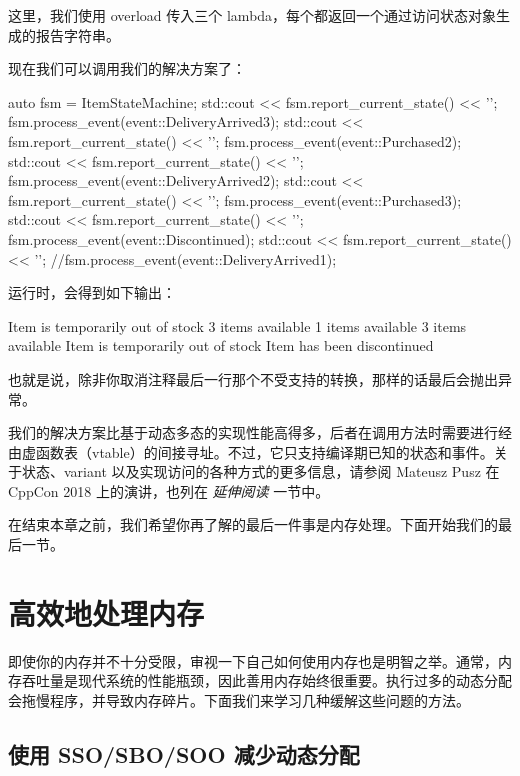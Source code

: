 \label{idx:597}
这里，我们使用 overload 传入三个 lambda，每个都返回一个通过访问状态对象生成的报告字符串。

现在我们可以调用我们的解决方案了：

\begin{codebox}[cpp]
auto fsm = ItemStateMachine{};
std::cout << fsm.report_current_state() << '\n';
fsm.process_event(event::DeliveryArrived{3});
std::cout << fsm.report_current_state() << '\n';
fsm.process_event(event::Purchased{2});
std::cout << fsm.report_current_state() << '\n';
fsm.process_event(event::DeliveryArrived{2});
std::cout << fsm.report_current_state() << '\n';
fsm.process_event(event::Purchased{3});
std::cout << fsm.report_current_state() << '\n';
fsm.process_event(event::Discontinued{});
std::cout << fsm.report_current_state() << '\n';
//fsm.process_event(event::DeliveryArrived{1});
\end{codebox}

运行时，会得到如下输出：

\begin{codebox}[text]
Item is temporarily out of stock
3 items available
1 items available
3 items available
Item is temporarily out of stock
Item has been discontinued
\end{codebox}

也就是说，除非你取消注释最后一行那个不受支持的转换，那样的话最后会抛出异常。

我们的解决方案比基于动态多态的实现性能高得多，后者在调用方法时需要进行经由虚函数表（vtable）的间接寻址。不过，它只支持编译期已知的状态和事件。关于状态、variant 以及实现访问的各种方式的更多信息，请参阅 Mateusz Pusz 在 CppCon 2018 上的演讲，也列在 \emph{延伸阅读} 一节中。

在结束本章之前，我们希望你再了解的最后一件事是内存处理。下面开始我们的最后一节。

\section{高效地处理内存}

\label{idx:598}
即使你的内存并不十分受限，审视一下自己如何使用内存也是明智之举。通常，内存吞吐量是现代系统的性能瓶颈，因此善用内存始终很重要。执行过多的动态分配会拖慢程序，并导致内存碎片。下面我们来学习几种缓解这些问题的方法。

\subsection{使用 SSO/SBO/SOO 减少动态分配}


